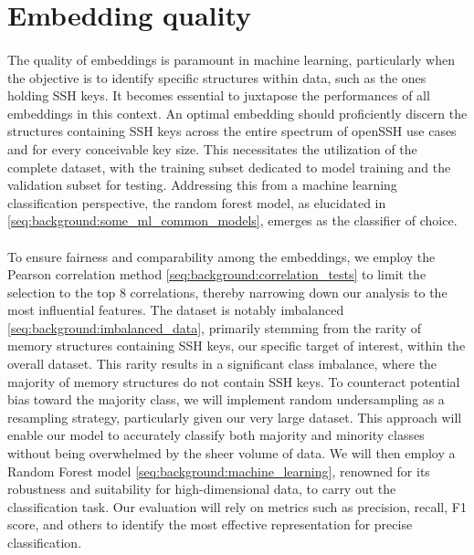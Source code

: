 \section{Embedding quality}\label{chap:embedding_quality}
\paragraph{}The quality of embeddings is paramount in machine learning, particularly when the objective is to identify specific \glspl{structure} within data, such as the ones holding SSH keys. It becomes essential to juxtapose the performances of all embeddings in this context. An optimal embedding should proficiently discern the \glspl{structure} containing SSH keys across the entire spectrum of openSSH use cases and for every conceivable key size. This necessitates the utilization of the complete dataset, with the training subset dedicated to model training and the validation subset for testing. Addressing this from a machine learning classification perspective, the random forest model, as elucidated in \ref{seq:background:some_ml_common_models}, emerges as the classifier of choice.

\paragraph{} To ensure fairness and comparability among the embeddings, we employ the Pearson correlation method \ref{seq:background:correlation_tests} to limit the selection to the top 8 correlations, thereby narrowing down our analysis to the most influential features. The dataset is notably imbalanced \ref{seq:background:imbalanced_data}, primarily stemming from the rarity of memory structures containing SSH keys, our specific target of interest, within the overall dataset. This rarity results in a significant class imbalance, where the majority of memory structures do not contain SSH keys. To counteract potential bias toward the majority class, we will implement random undersampling as a resampling strategy, particularly given our very large dataset. This approach will enable our model to accurately classify both majority and minority classes without being overwhelmed by the sheer volume of data. We will then employ a Random Forest model \ref{seq:background:machine_learning}, renowned for its robustness and suitability for high-dimensional data, to carry out the classification task. Our evaluation will rely on metrics such as precision, recall, F1 score, and others to identify the most effective representation for precise classification.

